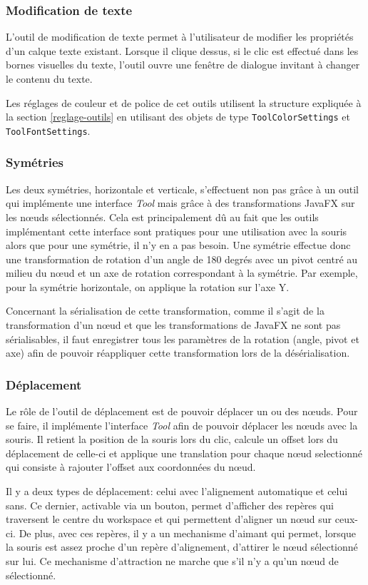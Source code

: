 \subsubsection{Modification de texte}
L'outil de modification de texte permet à l'utilisateur de modifier les propriétés d'un calque texte existant. Lorsque il clique dessus, si le clic est effectué dans les bornes visuelles du texte, l'outil ouvre une fenêtre de dialogue invitant à changer le contenu du texte.
\par
Les réglages de couleur et de police de cet outils utilisent la structure expliquée à la section \ref{reglage-outils} en utilisant des objets de type \texttt{ToolColorSettings} et \texttt{ToolFontSettings}.
\subsubsection{Symétries}

Les deux symétries, horizontale et verticale, s'effectuent non pas grâce à un outil qui implémente une interface \textit{Tool} mais grâce à des transformations JavaFX sur les n\oe uds sélectionnés. Cela est principalement dû au fait que les outils implémentant cette interface sont pratiques pour une utilisation avec la souris alors que pour une symétrie, il n'y en a pas besoin. Une symétrie effectue donc une transformation de rotation d'un angle de 180 degrés avec un pivot centré au milieu du n\oe ud et un axe de rotation correspondant à la symétrie. Par exemple, pour la symétrie horizontale, on applique la rotation sur l'axe Y.

Concernant la sérialisation de cette transformation, comme il s'agit de la transformation d'un n\oe ud et que les transformations de JavaFX ne sont pas sérialisables, il faut enregistrer tous les paramètres de la rotation (angle, pivot et axe) afin de pouvoir réappliquer cette transformation lors de la désérialisation.
\subsubsection{Déplacement}
Le rôle de l'outil de déplacement est de pouvoir déplacer un ou des n\oe uds. Pour se faire, il implémente l'interface \textit{Tool} afin de pouvoir déplacer les n\oe uds avec la souris. Il retient la position de la souris lors du clic, calcule un offset lors du déplacement de celle-ci et applique une translation pour chaque n\oe ud selectionné qui consiste à rajouter l'offset aux coordonnées du n\oe ud.

 Il y a deux types de déplacement: celui avec l'alignement automatique et celui sans. Ce dernier, activable via un bouton, permet d'afficher des repères qui traversent le centre du workspace et qui permettent d'aligner un n\oe ud sur ceux-ci. De plus, avec ces repères, il y a un mechanisme d'aimant qui permet, lorsque la souris est assez proche d'un repère d'alignement, d'attirer le n\oe ud sélectionné sur lui. Ce mechanisme d'attraction ne marche que s'il n'y a qu'un n\oe ud de sélectionné.
